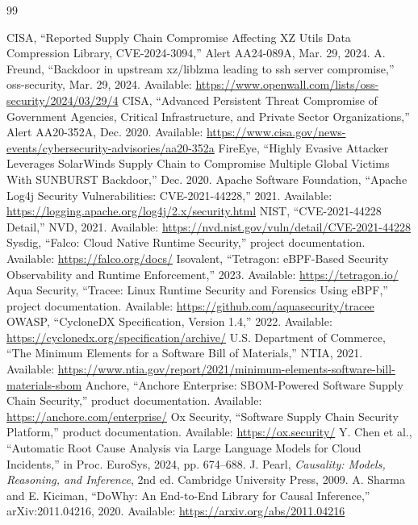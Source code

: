 \documentclass[12pt,a4paper,oneside]{report}
\begin{document}
\renewcommand{\bibname}{References}
\begin{thebibliography}{99}
 CISA, ``Reported Supply Chain Compromise Affecting XZ Utils Data Compression Library, CVE-2024-3094,'' Alert AA24-089A, Mar. 29, 2024.
 A. Freund, ``Backdoor in upstream xz/liblzma leading to ssh server compromise,'' oss-security, Mar. 29, 2024. Available: \url{https://www.openwall.com/lists/oss-security/2024/03/29/4}
 CISA, ``Advanced Persistent Threat Compromise of Government Agencies, Critical Infrastructure, and Private Sector Organizations,'' Alert AA20-352A, Dec. 2020. Available: \url{https://www.cisa.gov/news-events/cybersecurity-advisories/aa20-352a}
 FireEye, ``Highly Evasive Attacker Leverages SolarWinds Supply Chain to Compromise Multiple Global Victims With SUNBURST Backdoor,'' Dec. 2020.
 Apache Software Foundation, ``Apache Log4j Security Vulnerabilities: CVE-2021-44228,'' 2021. Available: \url{https://logging.apache.org/log4j/2.x/security.html}
 NIST, ``CVE-2021-44228 Detail,'' NVD, 2021. Available: \url{https://nvd.nist.gov/vuln/detail/CVE-2021-44228}
 Sysdig, ``Falco: Cloud Native Runtime Security,'' project documentation. Available: \url{https://falco.org/docs/}
 Isovalent, ``Tetragon: eBPF-Based Security Observability and Runtime Enforcement,'' 2023. Available: \url{https://tetragon.io/}
 Aqua Security, ``Tracee: Linux Runtime Security and Forensics Using eBPF,'' project documentation. Available: \url{https://github.com/aquasecurity/tracee}
 OWASP, ``CycloneDX Specification, Version 1.4,'' 2022. Available: \url{https://cyclonedx.org/specification/archive/}
 U.S. Department of Commerce, ``The Minimum Elements for a Software Bill of Materials,'' NTIA, 2021. Available: \url{https://www.ntia.gov/report/2021/minimum-elements-software-bill-materials-sbom}
 Anchore, ``Anchore Enterprise: SBOM-Powered Software Supply Chain Security,'' product documentation. Available: \url{https://anchore.com/enterprise/}
 Ox Security, ``Software Supply Chain Security Platform,'' product documentation. Available: \url{https://ox.security/}
 Y. Chen et al., ``Automatic Root Cause Analysis via Large Language Models for Cloud Incidents,'' in Proc. EuroSys, 2024, pp. 674--688.
 J. Pearl, \emph{Causality: Models, Reasoning, and Inference}, 2nd ed. Cambridge University Press, 2009.
 A. Sharma and E. Kiciman, ``DoWhy: An End-to-End Library for Causal Inference,'' arXiv:2011.04216, 2020. Available: \url{https://arxiv.org/abs/2011.04216}

\end{thebibliography}
\end{document}
